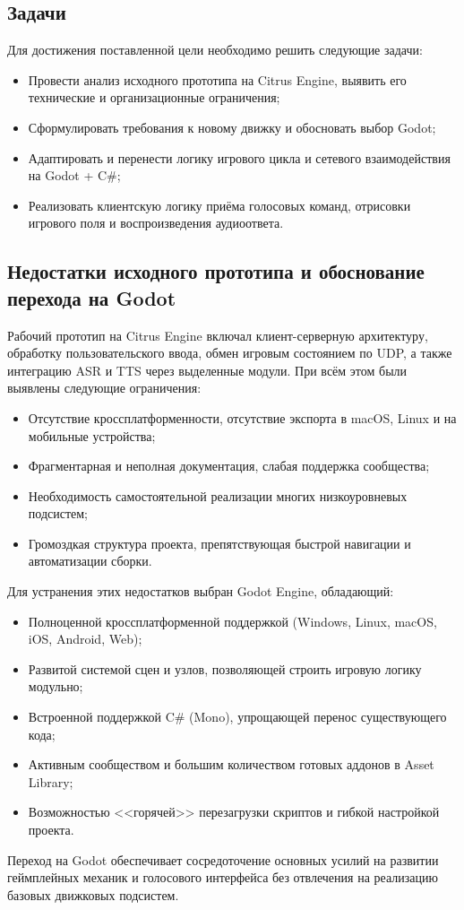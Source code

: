     \subsection{Задачи}
    Для достижения поставленной цели необходимо решить следующие задачи:
    \begin{itemize}
    \item Провести анализ исходного прототипа на Citrus Engine, выявить его технические и организационные ограничения;
    \item Сформулировать требования к новому движку и обосновать выбор Godot;
    \item Адаптировать и перенести логику игрового цикла и сетевого взаимодействия на Godot + C\#;
    \item Реализовать клиентскую логику приёма голосовых команд, отрисовки игрового поля и воспроизведения аудиоответа.
    \end{itemize}

    \subsection{Недостатки исходного прототипа и обоснование перехода на Godot}
    Рабочий прототип на Citrus Engine включал клиент-серверную архитектуру, обработку пользовательского ввода, обмен игровым состоянием по 
    UDP, а также интеграцию ASR и TTS через выделенные модули. При всём этом были выявлены следующие ограничения:
    \begin{itemize}
    \item Отсутствие кроссплатформенности, отсутствие экспорта в macOS, Linux и на мобильные устройства;
    \item Фрагментарная и неполная документация, слабая поддержка сообщества;
    \item Необходимость самостоятельной реализации многих низкоуровневых подсистем;
    \item Громоздкая структура проекта, препятствующая быстрой навигации и автоматизации сборки.
    \end{itemize}

    Для устранения этих недостатков выбран Godot Engine, обладающий:
    \begin{itemize}
    \item Полноценной кроссплатформенной поддержкой (Windows, Linux, macOS, iOS, Android, Web);
    \item Развитой системой сцен и узлов, позволяющей строить игровую логику модульно;
    \item Встроенной поддержкой C\# (Mono), упрощающей перенос существующего кода;
    \item Активным сообществом и большим количеством готовых аддонов в Asset Library;
    \item Возможностью <<горячей>> перезагрузки скриптов и гибкой настройкой проекта.
    \end{itemize}

    Переход на Godot обеспечивает сосредоточение основных усилий на развитии геймплейных механик и голосового интерфейса без отвлечения 
    на реализацию базовых движковых подсистем.